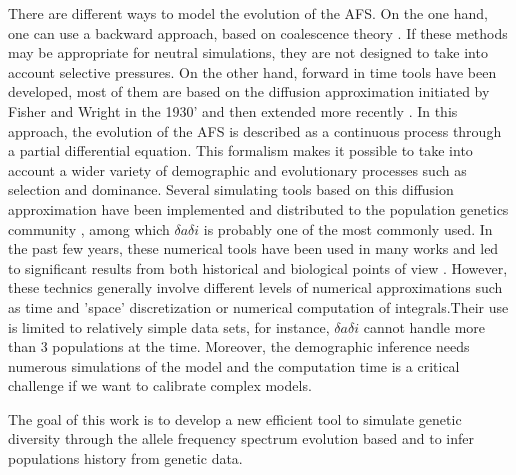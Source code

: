 There are different ways to model the evolution of the AFS. On the one hand, one can use a backward approach, based on coalescence theory \cite{excoffier2011}. If these methods may be appropriate for neutral simulations, they are not designed to take into account selective pressures. On the other hand, forward in time tools have been developed, most of them are based on the diffusion approximation initiated by Fisher and Wright in the 1930' \cite{fisher1930, wright1931} and then extended more recently \cite{crow1970, kimura1964}. In this approach, the evolution of the AFS is described as a continuous process through a partial differential equation. This formalism makes it possible to take into account a wider variety of demographic and evolutionary processes such as selection and dominance. Several simulating tools based on this diffusion approximation have been implemented and distributed to the population genetics community \cite{gutenkunst2009, lukic2012, lukic2011}, among which $\delta a \delta i$ is probably one of the most commonly used. In the past few years, these numerical tools have been used in many works and led to significant results from both historical and biological points of view \cite{gutenkunst2009, gravel2011, schmutz2014}. However, these technics generally involve different levels of numerical approximations such as time and 'space' discretization or numerical computation of integrals.Their use is limited to relatively simple data sets, for instance, $\delta a \delta i$ cannot handle more than 3 populations at the time. Moreover, the demographic inference needs numerous simulations of the model and the computation time is a critical challenge if we want to calibrate complex models.

The goal of this work is to develop a new efficient tool to simulate genetic diversity through the allele frequency spectrum evolution based and to infer populations history from genetic data.
